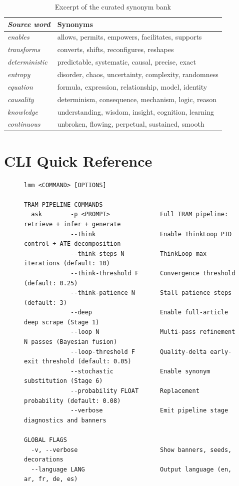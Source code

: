\documentclass[11pt,a4paper]{article}
\newcommand{\lmm}{\texorpdfstring{%
  \textbf{\color{lmmAccent}LMM}}{LMM}}
\begin{document}
\begin{table}[H]
\centering
\caption{Excerpt of the curated synonym bank}
\label{tab:synonyms}
\renewcommand{\arraystretch}{1.3}
\begin{tabular}{@{}>{\itshape}l p{9.0cm}@{}}
\toprule
\rowcolor{lmmHeaderBg}
{\color{white}\normalfont\textbf{Source word}} &
{\color{white}\textbf{Synonyms}} \\
\midrule
\rowcolor{white}     enables       & allows, permits, empowers, facilitates, supports \\
\rowcolor{lmmRowAlt} transforms    & converts, shifts, reconfigures, reshapes \\
\rowcolor{white}     deterministic & predictable, systematic, causal, precise, exact \\
\rowcolor{lmmRowAlt} entropy       & disorder, chaos, uncertainty, complexity, randomness \\
\rowcolor{white}     equation      & formula, expression, relationship, model, identity \\
\rowcolor{lmmRowAlt} causality     & determinism, consequence, mechanism, logic, reason \\
\rowcolor{white}     knowledge     & understanding, wisdom, insight, cognition, learning \\
\rowcolor{lmmRowAlt} continuous    & unbroken, flowing, perpetual, sustained, smooth \\
\bottomrule
\end{tabular}
\end{table}

\section{CLI Quick Reference}
\label{app:cli}

\begin{figure}[H]
\begin{lstlisting}[style=code, caption={\lmm{} CLI command summary (v0.5.0)}]
lmm <COMMAND> [OPTIONS]

TRAM PIPELINE COMMANDS
  ask        -p <PROMPT>              Full TRAM pipeline: retrieve + infer + generate
             --think                  Enable ThinkLoop PID control + ATE decomposition
             --think-steps N          ThinkLoop max iterations (default: 10)
             --think-threshold F      Convergence threshold (default: 0.25)
             --think-patience N       Stall patience steps (default: 3)
             --deep                   Enable full-article deep scrape (Stage 1)
             --loop N                 Multi-pass refinement N passes (Bayesian fusion)
             --loop-threshold F       Quality-delta early-exit threshold (default: 0.05)
             --stochastic             Enable synonym substitution (Stage 6)
             --probability FLOAT      Replacement probability (default: 0.08)
             --verbose                Emit pipeline stage diagnostics and banners

GLOBAL FLAGS
  -v, --verbose                       Show banners, seeds, decorations
  --language LANG                     Output language (en, ar, fr, de, es)
\end{lstlisting}
\end{figure}
\end{document}
